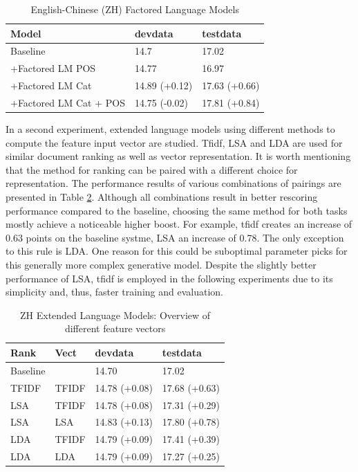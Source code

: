 \documentclass[a4paper]{article}
\begin{document}
\begin{table}
\caption{English-Chinese (ZH) Factored Language Models}
\centering
  \begin{tabular}{ lll }
  	\hline
  	Model                  & devdata       & testdata      \\ \hline\hline
  	Baseline               & 14.7          & 17.02         \\
  	+Factored LM POS       & 14.77         & 16.97         \\ \hline
  	+Factored LM Cat       & 14.89 (+0.12) & 17.63 (+0.66) \\
  	+Factored LM Cat + POS & 14.75 (-0.02) & 17.81 (+0.84) \\ \hline
  \end{tabular}
  \label{tb:zh-factored}
\end{table}

In a second experiment, extended language models using different methods to compute the feature input vector are studied. Tfidf, LSA and LDA are used for similar document ranking as well as vector representation. It is worth mentioning that the method for ranking can be paired with a different choice for representation. The performance results of various combinations of pairings are presented in Table \ref{tb:zh-extended-diff-features}. Although all combinations result in better rescoring performance compared to the baseline, choosing the same method for both tasks mostly achieve a noticeable higher boost. For example, tfidf creates an increase of 0.63 points on the baseline systme, LSA an increase of 0.78. The only exception to this rule is LDA. One reason for this could be suboptimal parameter picks for this generally more complex generative model. Despite the slightly better performance of LSA, tfidf is employed in the following experiments due to its simplicity and, thus, faster training and evaluation.

\begin{table}
\caption{ZH Extended Language Models: Overview of different feature vectors}
\centering
  \begin{tabular}{llll}
  	\hline
  	Rank     & Vect  & devdata       & testdata      \\ \hline\hline
  	Baseline &       & 14.70         & 17.02         \\ \hline
  	TFIDF    & TFIDF & 14.78 (+0.08) & 17.68 (+0.63) \\
  	LSA      & TFIDF & 14.78 (+0.08) & 17.31 (+0.29) \\
  	LSA      & LSA   & 14.83 (+0.13) & 17.80 (+0.78) \\
  	LDA      & TFIDF & 14.79 (+0.09) & 17.41 (+0.39) \\
  	LDA      & LDA   & 14.79 (+0.09) & 17.27 (+0.25)
  \end{tabular}
  \label{tb:zh-extended-diff-features}
\end{table}
\end{document}

